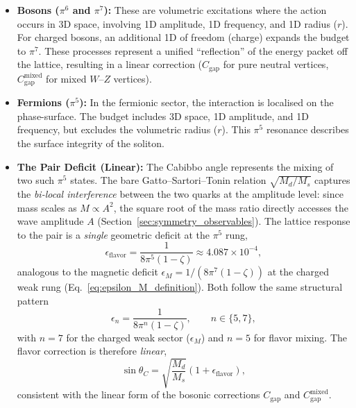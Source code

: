 \documentclass[10pt,a4paper]{article}
\begin{document}
\begin{itemize}
	\item \textbf{Bosons ($\pi^6$ and $\pi^7$):} These are volumetric
	excitations where the action occurs in 3D space, involving 1D
	amplitude, 1D frequency, and 1D radius ($r$). For charged bosons, an
	additional 1D of freedom (charge) expands the budget to $\pi^7$.
	These processes represent a unified ``reflection'' of the energy
	packet off the lattice, resulting in a linear correction
	($C_{\text{gap}}$ for pure neutral vertices,
	$C_{\text{gap}}^{\text{mixed}}$ for mixed $W$--$Z$ vertices).
	
	\item \textbf{Fermions ($\pi^5$):} In the fermionic sector, the
	interaction is localised on the phase-surface. The budget includes
	3D space, 1D amplitude, and 1D frequency, but excludes the
	volumetric radius ($r$). This $\pi^5$ resonance describes the
	surface integrity of the soliton.
	
	\item \textbf{The Pair Deficit (Linear):} The Cabibbo angle
	represents the mixing of two such $\pi^5$ states. The bare
	Gatto--Sartori--Tonin relation $\sqrt{M_d/M_s}$ captures the
	\emph{bi-local interference} between the two quarks at the
	amplitude level: since mass scales as $M \propto A^2$, the square
	root of the mass ratio directly accesses the wave amplitude $A$
	(Section~\ref{sec:symmetry_observables}). The lattice response to
	the pair is a \emph{single} geometric deficit at the $\pi^5$ rung,
	\begin{equation}
		\epsilon_{\text{flavor}}
		= \frac{1}{8\pi^5(1-\zeta)}
		\approx 4.087 \times 10^{-4},
		\label{eq:eps_flavor}
	\end{equation}
	analogous to the magnetic deficit
	$\epsilon_M = 1/(8\pi^7(1-\zeta))$ at the charged weak rung
	(Eq.~\ref{eq:epsilon_M_definition}). Both follow the same
	structural pattern
	\begin{equation}
		\epsilon_n = \frac{1}{8\pi^n(1-\zeta)},
		\qquad n \in \{5, 7\},
	\end{equation}
	with $n = 7$ for the charged weak sector ($\epsilon_M$) and $n = 5$
	for flavor mixing. The flavor correction is therefore
	\emph{linear},
	\begin{equation}
		\sin\theta_C = \sqrt{\frac{M_d}{M_s}}
		\left(1 + \epsilon_{\text{flavor}}\right),
		\label{eq:cabibbo_linear}
	\end{equation}
	consistent with the linear form of the bosonic corrections
	$C_{\text{gap}}$ and $C_{\text{gap}}^{\text{mixed}}$.
\end{itemize}
\end{document}
